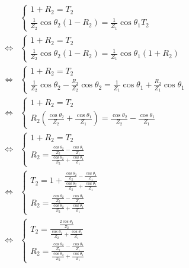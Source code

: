 \begin{eqnarray*}
    & & \left\{\begin{array}{l}
        1 + R_2  = T_2\\ 
        \frac{1}{Z_2}\cos\theta_2(1 - R_2) = \frac{1}{Z_1}\cos\theta_1T_2
    \end{array}\right.\\
    & \Leftrightarrow &
    \left\{\begin{array}{l}
        1 + R_2  = T_2\\ 
        \frac{1}{Z_2}\cos\theta_2(1 - R_2) = \frac{1}{Z_1}\cos\theta_1(1+R_2)
    \end{array}\right.\\
    & \Leftrightarrow &
    \left\{\begin{array}{l}
        1 + R_2  = T_2\\ 
        \frac{1}{Z_2}\cos\theta_2 - \frac{R_2}{Z_2}\cos\theta_2 = \frac{1}{Z_1}\cos\theta_1+\frac{R_2}{Z_1}\cos\theta_1
    \end{array}\right.\\
    & \Leftrightarrow &
    \left\{\begin{array}{l}
        1 + R_2  = T_2\\ 
        R_2\left(\frac{\cos\theta_2}{Z_2} + \frac{\cos\theta_1}{Z_1}\right) = \frac{\cos\theta_2}{Z_2}-\frac{\cos\theta_1}{Z_1}
    \end{array}\right.\\
    & \Leftrightarrow &
    \left\{\begin{array}{l}
        1 + R_2  = T_2\\ 
        R_2 = \frac{\frac{\cos\theta_2}{Z_2}-\frac{\cos\theta_1}{Z_1}}{\frac{\cos\theta_2}{Z_2} + \frac{\cos\theta_1}{Z_1}}
    \end{array}\right.\\
    & \Leftrightarrow &
    \left\{\begin{array}{l}
        T_2 = 1 +\frac{\frac{\cos\theta_2}{Z_2}-\frac{\cos\theta_1}{Z_1}}{\frac{\cos\theta_2}{Z_2} + \frac{\cos\theta_1}{Z_1}}\\ 
        R_2 = \frac{\frac{\cos\theta_2}{Z_2}-\frac{\cos\theta_1}{Z_1}}{\frac{\cos\theta_2}{Z_2} + \frac{\cos\theta_1}{Z_1}}
    \end{array}\right.\\
    & \Leftrightarrow &
    \left\{\begin{array}{l}
        T_2 = \frac{\frac{2\cos\theta_2}{Z_2}}{\frac{\cos\theta_2}{Z_2} + \frac{\cos\theta_1}{Z_1}}\\ 
        R_2 = \frac{\frac{\cos\theta_2}{Z_2}-\frac{\cos\theta_1}{Z_1}}{\frac{\cos\theta_2}{Z_2} + \frac{\cos\theta_1}{Z_1}}
    \end{array}\right.
\end{eqnarray*}



